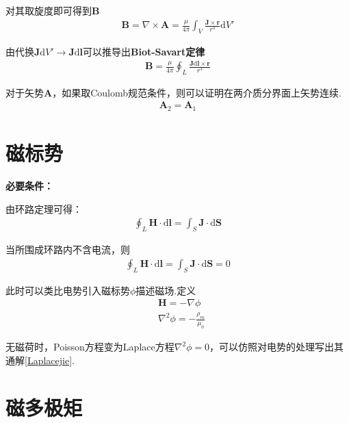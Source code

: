 \documentclass[main.tex]{subfiles}
\begin{document}
对其取旋度即可得到$\boldsymbol{B}$
\begin{align}
    \boldsymbol{B} = \nabla \times \boldsymbol{A} = \frac{\mu}{4\pi}\int _{V}^{}\frac{\boldsymbol{J}\times \boldsymbol{r}}{r^3}\mathrm{d}V'
\end{align}

由代换$\boldsymbol{J}\mathrm{d}V'\to \boldsymbol{J}\mathrm{d}\boldsymbol{l}$可以推导出\textbf{Biot-Savart定律}
\begin{align}
    \boldsymbol{B} =  \frac{\mu}{4\pi}\oint_{L}^{} \frac{\boldsymbol{J}\mathrm{d}\boldsymbol{l} \times \boldsymbol{r}}{r^3}
\end{align}

对于矢势$\boldsymbol{A}$，如果取Coulomb规范条件，则可以证明在两介质分界面上矢势连续.
\begin{align}
    \boldsymbol{A}_2 = \boldsymbol{A}_1
\end{align}

\section{磁标势}
\begin{figure}
	\centering
	
\end{figure}

\textbf{必要条件：}

由环路定理可得：
\begin{align}
    \oint_{L} \boldsymbol{H} \cdot \mathrm{d}\boldsymbol{l} = \int _{S} \boldsymbol{J} \cdot \mathrm{d} \boldsymbol{S}
\end{align}

当所围成环路内不含电流，则
\begin{align}
    \oint_{L} \boldsymbol{H} \cdot \mathrm{d}\boldsymbol{l} = \int _{S} \boldsymbol{J} \cdot \mathrm{d} \boldsymbol{S} =0
\end{align}

此时可以类比电势引入磁标势$\phi$描述磁场.定义
\begin{align}
    &\boldsymbol{H} = -\nabla \phi\\
    &\nabla ^2 \phi = -\frac{\rho_m}{\mu _0}
\end{align}

无磁荷时，Poisson方程变为Laplace方程$\nabla ^2\phi = 0$，可以仿照对电势的处理写出其通解\ref{Laplacejie}.

\section{磁多极矩}
\end{document}
